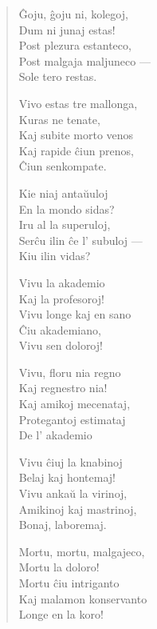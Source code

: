 \begin{verse}
                        \^Goju, \^goju ni, kolegoj,\\
                        Dum ni junaj estas!\\
                        Post plezura estanteco,\\
                        Post malgaja maljuneco ---\\
                        \vin   Sole tero restas.

                        Vivo estas tre mallonga,\\
                        Kuras ne tenate,\\
                        Kaj subite morto venos\\
                        Kaj rapide \^ciun prenos,\\
                        \vin   \^Ciun senkompate.

                        Kie niaj anta\u uuloj\\
                        En la mondo sidas?\\
                        Iru al la superuloj,\\
                        Ser\^cu ilin \^ce l' subuloj ---\\
                        \vin   Kiu ilin vidas?

                        Vivu la akademio\\
                        Kaj la profesoroj!\\
                        Vivu longe kaj en sano\\
                        \^Ciu akademiano,\\
                        \vin   Vivu sen doloroj!

                        Vivu, floru nia regno\\
                        Kaj regnestro nia!\\
                        Kaj amikoj mecenataj,\\
                        Protegantoj estimataj\\
                        \vin   De l' akademio

                        Vivu \^ciuj la knabinoj\\
                        Belaj kaj hontemaj!\\
                        Vivu anka\u u la virinoj,\\
                        Amikinoj kaj mastrinoj,\\
                        \vin   Bonaj, laboremaj.

                        Mortu, mortu, malgajeco,\\
                        Mortu la doloro!\\
                        Mortu \^ciu intriganto\\
                        Kaj malamon konservanto\\
                        \vin   Longe en la koro!

\end{verse}


\smallrule{}

